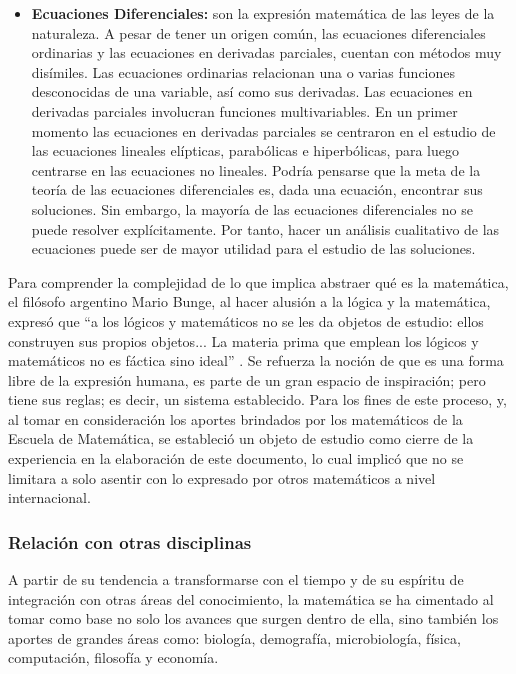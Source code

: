 \begin{itemize}
    \color{blue} \item \color{black} \textbf{Ecuaciones Diferenciales:} son la expresión matemática de las leyes de la naturaleza. A pesar de tener un origen común, las ecuaciones diferenciales ordinarias y las ecuaciones en derivadas parciales, cuentan con métodos muy disímiles. Las ecuaciones ordinarias relacionan una o varias funciones desconocidas de una variable, así como sus derivadas. Las ecuaciones en derivadas parciales involucran funciones multivariables. En un primer momento las ecuaciones en derivadas parciales se centraron en el estudio de las ecuaciones lineales elípticas, parabólicas e hiperbólicas, para luego centrarse en las ecuaciones no lineales. Podría pensarse que la meta de la teoría de las ecuaciones diferenciales es, dada una ecuación, encontrar sus soluciones. Sin embargo, la mayoría de las ecuaciones diferenciales no se puede resolver explícitamente. Por tanto, hacer un análisis cualitativo de las ecuaciones puede ser de mayor utilidad para el estudio de las soluciones.
    \end{itemize}

Para comprender la complejidad de lo que implica abstraer qué es la matemática, el filósofo argentino Mario Bunge, al hacer alusión a la lógica y la matemática, expresó que “a los lógicos y matemáticos no se les da objetos de estudio: ellos construyen sus propios objetos... La materia prima que emplean los lógicos y matemáticos no es fáctica sino ideal” \cite{Bunge1960}. Se refuerza la noción de que es
una forma libre de la expresión humana, es parte de un gran espacio de inspiración; pero tiene sus reglas; es decir, un sistema establecido. Para los fines de este proceso, y, al tomar en consideración los aportes brindados por los matemáticos de la Escuela de Matemática, se estableció un objeto de estudio como cierre de la experiencia en la elaboración de este documento, lo cual implicó que no se limitara a solo asentir con lo expresado por otros matemáticos a nivel internacional. 

\subsubsection{Relación con otras disciplinas}

A partir de su tendencia a transformarse con el tiempo y de su espíritu de integración con otras áreas del conocimiento, la matemática se ha cimentado al tomar como base no solo los avances que surgen dentro de ella, sino también los aportes de grandes áreas como: biología, demografía, microbiología, física, computación, filosofía y economía. 

